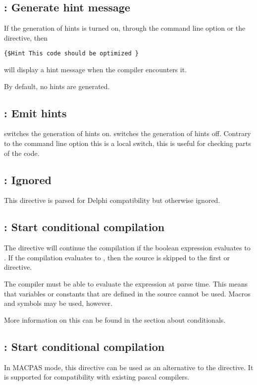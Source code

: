 \subsection{ : Generate hint message}

If the generation of hints is turned on, through the  command line
option or the  directive, then
\begin{verbatim}
{$Hint This code should be optimized }
\end{verbatim}
will display a hint message when the compiler encounters it.

By default, no hints are generated.

\subsection{ : Emit hints}

 switches the generation of hints on.
 switches the generation of hints off.
Contrary to the command line option  this is a local switch,
this is useful for checking parts of the code.

\subsection{: Ignored}
This directive is parsed for Delphi compatibility but otherwise ignored.

\subsection{ : Start conditional compilation}

The directive  will continue the compilation
if the boolean expression  evaluates to . If the
compilation evaluates to , then the source is skipped to the first
 or  directive.

The compiler must be able to evaluate the expression at parse time.
This means that variables or constants that are defined in
the source cannot be used. Macros and symbols may be used, however.

More information on this can be found in the section about
conditionals.

\subsection{ : Start conditional compilation}
In MACPAS mode, this directive can be used as an alternative to the 
directive. It is supported for compatibility with existing \macos pascal
compilers.

